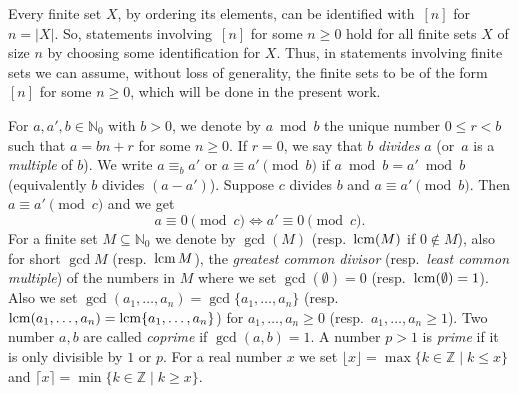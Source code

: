Every finite set $X$, by ordering its elements,
can be identified with~$[n]$ for $n = |X|$.
So, statements involving~$[n]$ for some $n \ge 0$
hold for all finite sets $X$ of size $n$
by choosing some identification for $X$.
Thus, in statements involving finite sets we can assume,
without loss of generality, the finite sets to be of the form~$[n]$
for some $n \ge 0$, which will be done in the present work.

\label{def:tuple-notation-function}
\label{def:pi}


 \label{def:lcm}
\label{def:gcd}
\label{def:bmod}  \label{def:residue_congruence}
For $a,a',b\in \mathbb N_0$ with $b > 0$, we denote by $a \bmod b$  the unique number $0 \le r < b$
such that $a = bn + r$ for some $n \ge 0$. If $r = 0$, we say that $b$ \emph{divides} $a$ (or~$a$ is a \emph{multiple} of $b$).
We write $a \equiv_b a'$ or $a \equiv a' \pmod{b}$
if $a \bmod b = a' \bmod b$ (equivalently $b$ divides $(a-a')$).
Suppose $c$ divides $b$ and $a \equiv a' \pmod{b}$.
Then $a \equiv a' \pmod{c}$ and we get
\begin{equation}\label{prelim:eqn:ab_divisor}
	a  \equiv 0 \pmod{c} \Leftrightarrow 
	a' \equiv 0 \pmod{c}.
\end{equation}
For a finite set $M \subseteq \mathbb N_0$
we denote by $\gcd(M)$ (resp.~$\operatorname{lcm}(M)$ if $0\notin M$), also for short $\gcd M$ (resp.~$\operatorname{lcm} M$),
the \emph{greatest common divisor} (resp.~\emph{least common multiple}) of the numbers in $M$
where we set $\gcd(\emptyset) = 0$ (resp.~$\operatorname{lcm}(\emptyset) = 1$).
Also we set  $\gcd(a_1, \ldots, a_n) = \gcd\{a_1, \ldots, a_n\}$ (resp.~$\operatorname{lcm}(a_1, \ldots, a_n) = \operatorname{lcm}\{ a_1, \ldots, a_n\}$)
for $a_1, \ldots, a_n \ge 0$ (resp.~$a_1, \ldots, a_n \ge 1$).
Two number $a,b$ are called \emph{coprime} 
if $\gcd(a,b) = 1$. A number $p > 1$ is \emph{prime} if it is only divisible by $1$ or $p$.
For a real number $x$ we set $\lfloor x \rfloor = \max\{ k \in \mathbb Z \mid k \le x\}$
and $\lceil x \rceil = \min\{ k \in \mathbb Z \mid k \ge x\}$. \label{def:floorfn}\label{def:ceilfn}

